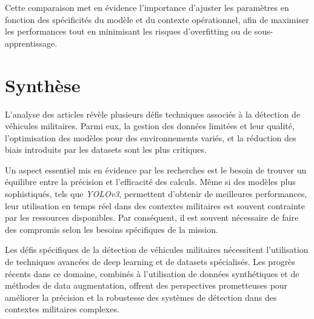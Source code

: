 Cette comparaison met en évidence l'importance d'ajuster les paramètres en fonction des spécificités du modèle et du contexte opérationnel, afin de maximiser les performances tout en minimisant les risques d'overfitting ou de sous-apprentissage.

\section{Synthèse}

L'analyse des articles révèle plusieurs défis techniques associés à la détection de véhicules militaires. Parmi eux, la gestion des données limitées et leur qualité, l'optimisation des modèles pour des environnements variés, et la réduction des biais introduits par les datasets sont les plus critiques.

Un aspect essentiel mis en évidence par les recherches est le besoin de trouver un équilibre entre la précision et l'efficacité des calculs. Même si des modèles plus sophistiqués, tels que \textit{YOLOv3}, permettent d'obtenir de meilleures performances, leur utilisation en temps réel dans des contextes militaires est souvent contrainte par les ressources disponibles. Par conséquent, il est souvent nécessaire de faire des compromis selon les besoins spécifiques de la mission.

Les défis spécifiques de la détection de véhicules militaires nécessitent l'utilisation de techniques avancées de deep learning et de datasets spécialisés. Les progrès récents dans ce domaine, combinés à l'utilisation de données synthétiques et de méthodes de data augmentation, offrent des perspectives prometteuses pour améliorer la précision et la robustesse des systèmes de détection dans des contextes militaires complexes.
